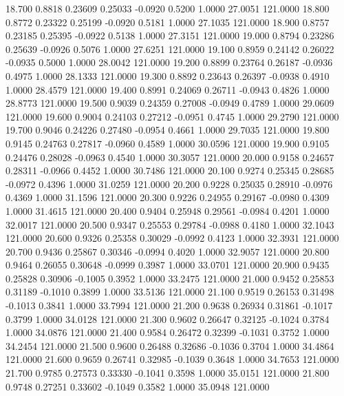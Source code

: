   18.700   0.8818   0.23609   0.25033  -0.0920   0.5200   1.0000  27.0051 121.0000
  18.800   0.8772   0.23322   0.25199  -0.0920   0.5181   1.0000  27.1035 121.0000
  18.900   0.8757   0.23185   0.25395  -0.0922   0.5138   1.0000  27.3151 121.0000
  19.000   0.8794   0.23286   0.25639  -0.0926   0.5076   1.0000  27.6251 121.0000
  19.100   0.8959   0.24142   0.26022  -0.0935   0.5000   1.0000  28.0042 121.0000
  19.200   0.8899   0.23764   0.26187  -0.0936   0.4975   1.0000  28.1333 121.0000
  19.300   0.8892   0.23643   0.26397  -0.0938   0.4910   1.0000  28.4579 121.0000
  19.400   0.8991   0.24069   0.26711  -0.0943   0.4826   1.0000  28.8773 121.0000
  19.500   0.9039   0.24359   0.27008  -0.0949   0.4789   1.0000  29.0609 121.0000
  19.600   0.9004   0.24103   0.27212  -0.0951   0.4745   1.0000  29.2790 121.0000
  19.700   0.9046   0.24226   0.27480  -0.0954   0.4661   1.0000  29.7035 121.0000
  19.800   0.9145   0.24763   0.27817  -0.0960   0.4589   1.0000  30.0596 121.0000
  19.900   0.9105   0.24476   0.28028  -0.0963   0.4540   1.0000  30.3057 121.0000
  20.000   0.9158   0.24657   0.28311  -0.0966   0.4452   1.0000  30.7486 121.0000
  20.100   0.9274   0.25345   0.28685  -0.0972   0.4396   1.0000  31.0259 121.0000
  20.200   0.9228   0.25035   0.28910  -0.0976   0.4369   1.0000  31.1596 121.0000
  20.300   0.9226   0.24955   0.29167  -0.0980   0.4309   1.0000  31.4615 121.0000
  20.400   0.9404   0.25948   0.29561  -0.0984   0.4201   1.0000  32.0017 121.0000
  20.500   0.9347   0.25553   0.29784  -0.0988   0.4180   1.0000  32.1043 121.0000
  20.600   0.9326   0.25358   0.30029  -0.0992   0.4123   1.0000  32.3931 121.0000
  20.700   0.9436   0.25867   0.30346  -0.0994   0.4020   1.0000  32.9057 121.0000
  20.800   0.9464   0.26055   0.30648  -0.0999   0.3987   1.0000  33.0701 121.0000
  20.900   0.9435   0.25828   0.30906  -0.1005   0.3952   1.0000  33.2475 121.0000
  21.000   0.9452   0.25853   0.31189  -0.1010   0.3899   1.0000  33.5136 121.0000
  21.100   0.9519   0.26153   0.31498  -0.1013   0.3841   1.0000  33.7994 121.0000
  21.200   0.9638   0.26934   0.31861  -0.1017   0.3799   1.0000  34.0128 121.0000
  21.300   0.9602   0.26647   0.32125  -0.1024   0.3784   1.0000  34.0876 121.0000
  21.400   0.9584   0.26472   0.32399  -0.1031   0.3752   1.0000  34.2454 121.0000
  21.500   0.9600   0.26488   0.32686  -0.1036   0.3704   1.0000  34.4864 121.0000
  21.600   0.9659   0.26741   0.32985  -0.1039   0.3648   1.0000  34.7653 121.0000
  21.700   0.9785   0.27573   0.33330  -0.1041   0.3598   1.0000  35.0151 121.0000
  21.800   0.9748   0.27251   0.33602  -0.1049   0.3582   1.0000  35.0948 121.0000
